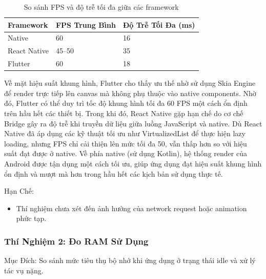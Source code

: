 \vspace{0.5em}

\begin{table}[H]
  \centering
  \begin{tabular}{|l|p{5cm}|p{5cm}|}
  \hline
  \textbf{Framework} & \textbf{FPS Trung Bình} & \textbf{Độ Trễ Tối Đa (ms)} \\
  \hline
  Native       & 60          & 16 \\
  React Native & 45--50      & 35 \\
  Flutter      & 60          & 18 \\
  \hline
  \end{tabular}
  \caption{So sánh FPS và độ trễ tối đa giữa các framework}
  \end{table}
  
  \begin{flushleft}
    \hspace*{0.8cm}Về mặt hiệu suất khung hình, Flutter cho thấy ưu thế nhờ sử dụng Skia Engine để render trực tiếp lên canvas mà không phụ thuộc vào native components. Nhờ đó, Flutter có thể duy trì tốc độ khung hình tối đa 60 FPS một cách ổn định trên hầu hết các thiết bị. Trong khi đó, React Native gặp hạn chế do cơ chế Bridge gây ra độ trễ khi truyền dữ liệu giữa luồng JavaScript và native. Dù React Native đã áp dụng các kỹ thuật tối ưu như VirtualizedList để thực hiện lazy loading, nhưng FPS chỉ cải thiện lên mức tối đa 50, vẫn thấp hơn so với hiệu suất đạt được ở native. Về phía native (sử dụng Kotlin), hệ thống render của Android được tận dụng một cách tối ưu, giúp ứng dụng đạt hiệu suất khung hình ổn định và mượt mà hơn trong hầu hết các kịch bản sử dụng thực tế.
  \end{flushleft}
  

\begin{flushleft}
  \hspace*{0.8cm}Hạn Chế:
  \setlength{\leftmargini}{1.5cm}
  \begin{itemize}
      \item Thí nghiệm chưa xét đến ảnh hưởng của network request hoặc animation phức tạp.
  \end{itemize}
\end{flushleft}

\subsubsection{Thí Nghiệm 2: Đo RAM Sử Dụng}
    \begin{flushleft}
      \hspace*{0.8cm}Mục Đích: So sánh mức tiêu thụ bộ nhớ khi ứng dụng ở trạng thái idle và xử lý tác vụ nặng.
    \end{flushleft}

